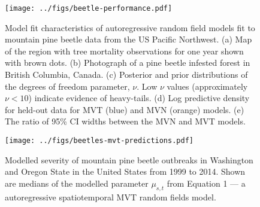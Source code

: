 \documentclass[12pt,english]{article}
\begin{document}
\begin{spacing}{1.9}
\begin{figure}[htb]
  \begin{center}
    \texttt{[image: ../figs/beetle-performance.pdf]}
    \caption{
      Model fit characteristics of autoregressive random field
      models fit to mountain pine beetle data from the US Pacific Northwest.
      (a) Map of the region with tree mortality observations for one year shown with
      brown dots.
      (b) Photograph of a pine beetle infested forest in British Columbia, Canada.
      (c) Posterior and prior distributions of the degrees of freedom parameter, $\nu$.
      Low $\nu$ values (approximately $\nu < 10$) indicate evidence of heavy-tails.
      (d) Log predictive density for held-out data for MVT (blue) and MVN (orange) models.
      (e) The ratio of 95\% CI widths between the MVN and MVT models.
    }
    \label{fig:map-etc}
  \end{center}
\end{figure}

\clearpage

\begin{figure}[htb]
  \begin{center}
    \texttt{[image: ../figs/beetles-mvt-predictions.pdf]}
    \caption{Modelled severity of mountain pine beetle outbreaks in Washington and
      Oregon State in the United States from 1999 to 2014.
      Shown are medians of the modelled parameter $\mu_{s,t}$ from Equation 1
      --- a autoregressive spatiotemporal MVT random fields model.
    }
    \label{fig:beetle-pred}
  \end{center}
\end{figure}


\end{spacing}
\end{document}

